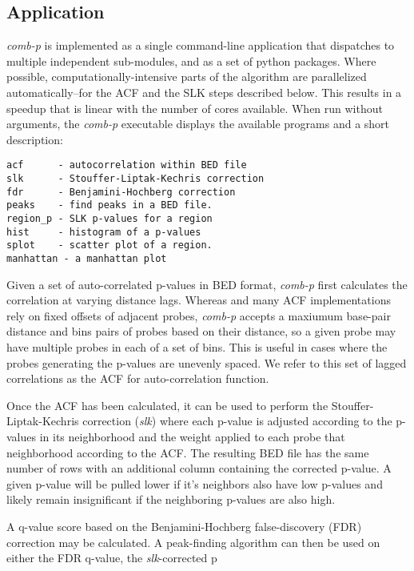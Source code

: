 \documentclass{bioinfo}
\begin{document}
\begin{methods}


\section{Application}
\textit{comb-p} is implemented as a single command-line application that
dispatches to multiple independent sub-modules, and as a set of python
packages. Where possible, computationally-intensive parts of the algorithm
are parallelized automatically--for the ACF and the SLK steps described below.
This results in a speedup that is linear with the number of cores available.
When run without arguments, the \textit{comb-p} executable displays the
available programs and a short description:
\begin{verbatim}
acf      - autocorrelation within BED file
slk      - Stouffer-Liptak-Kechris correction
fdr      - Benjamini-Hochberg correction
peaks    - find peaks in a BED file.
region_p - SLK p-values for a region
hist     - histogram of a p-values
splot    - scatter plot of a region.
manhattan - a manhattan plot
\end{verbatim}

Given a set of auto-correlated p-values in BED format, \textit{comb-p} first
calculates the correlation at varying distance lags. Whereas \citep{Kechris2010}
and many ACF implementations rely on fixed offsets of adjacent probes,
\textit{comb-p} accepts a maxiumum base-pair distance and bins pairs of probes
based on their distance, so a given probe may have multiple probes in each of
a set of bins. This is useful in cases where the probes generating the p-values
are unevenly spaced. We refer to this set of lagged correlations as the ACF for
auto-correlation function.

Once the ACF has been calculated, it can be used to perform the
Stouffer-Liptak-Kechris correction (\textit{slk}) where each p-value is
adjusted according to the p-values in its neighborhood and the weight applied
to each probe that neighborhood according to the ACF. The resulting BED file
has the same number of rows with an additional column containing the corrected
p-value. A given p-value will be pulled lower if it's neighbors also have low
p-values and likely remain insignificant if the neighboring p-values are also 
high.

A q-value score based on the Benjamini-Hochberg false-discovery (FDR) correction
 may be calculated. A peak-finding algorithm can then be used on either the FDR
q-value, the \textit{slk}-corrected p

\end{methods}
\end{document}

